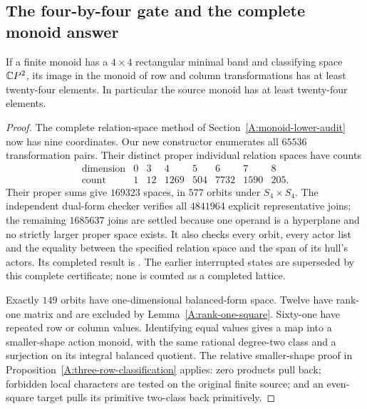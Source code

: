 \subsection{The four-by-four gate and the complete monoid answer}
\label{A:monoid-global-answer}

\begin{proposition}
\label{A:four-by-four-through23}
If a finite monoid has a $4\times4$ rectangular minimal band
and classifying space $\mathbb{C}P^2$, its image in the monoid of
row and column transformations has at least twenty-four elements.
In particular the source monoid has at least twenty-four elements.
\end{proposition}
\begin{proof}
The complete relation-space method of
Section~\ref{A:monoid-lower-audit} now has nine coordinates.
Our new constructor enumerates all $65536$ transformation
pairs. Their distinct proper individual relation spaces have
counts
\[
\begin{array}{c|rrrrrrr}
 \text{dimension}&0&3&4&5&6&7&8\\\hline
 \text{count}&1&12&1269&504&7732&1590&205.
\end{array}
\]
Their proper sums give $169323$ spaces, in $577$ orbits under
$S_4\times S_4$. The independent dual-form checker verifies
all $4841964$ explicit representative joins; the remaining
$1685637$ joins are settled because one operand is a
hyperplane and no strictly larger proper space exists.
It also checks every orbit, every actor list and the equality
between the specified relation space and the span of its
hull's actors. Its completed result is
.
The earlier interrupted states are superseded by this complete
certificate; none is counted as a completed lattice.

Exactly $149$ orbits have one-dimensional balanced-form
space. Twelve have rank-one matrix and are excluded by
Lemma~\ref{A:rank-one-square}. Sixty-one have repeated row
or column values. Identifying equal values gives a map into
a smaller-shape action monoid, with the same rational
degree-two class and a surjection on its integral balanced
quotient. The relative smaller-shape proof in
Proposition~\ref{A:three-row-classification} applies:
zero products pull back; forbidden local characters are
tested on the original finite source; and an even-square
target pulls its primitive two-class back primitively.


\end{proof}
